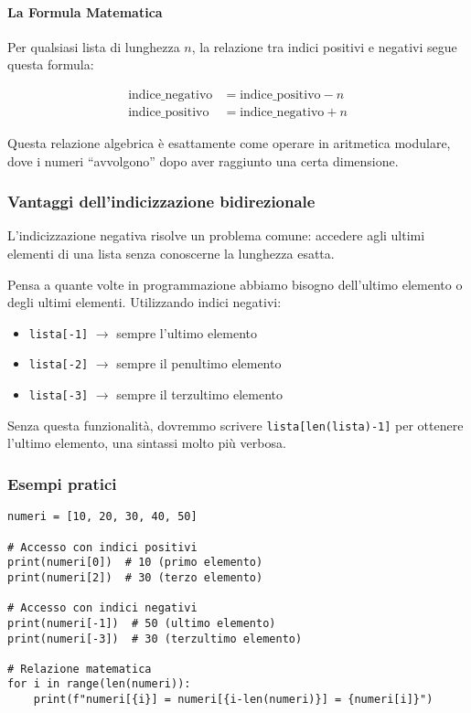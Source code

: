 \paragraph{La Formula Matematica}
Per qualsiasi lista di lunghezza $n$, la relazione tra indici positivi e negativi segue questa formula:

\begin{align}
\text{indice\_negativo} &= \text{indice\_positivo} - n\\
\text{indice\_positivo} &= \text{indice\_negativo} + n
\end{align}

Questa relazione algebrica è esattamente come operare in aritmetica modulare, dove i numeri ``avvolgono'' dopo aver raggiunto una certa dimensione.

\subsubsection{Vantaggi dell'indicizzazione bidirezionale}

L'indicizzazione negativa risolve un problema comune: accedere agli ultimi elementi di una lista senza conoscerne la lunghezza esatta.

Pensa a quante volte in programmazione abbiamo bisogno dell'ultimo elemento o degli ultimi elementi. Utilizzando indici negativi:

\begin{itemize}
    \item \texttt{lista[-1]} $\rightarrow$ sempre l'ultimo elemento
    \item \texttt{lista[-2]} $\rightarrow$ sempre il penultimo elemento
    \item \texttt{lista[-3]} $\rightarrow$ sempre il terzultimo elemento
\end{itemize}

Senza questa funzionalità, dovremmo scrivere \texttt{lista[len(lista)-1]} per ottenere l'ultimo elemento, una sintassi molto più verbosa.

\subsubsection{Esempi pratici}

\begin{lstlisting}[style=pythonstyle]
numeri = [10, 20, 30, 40, 50]

# Accesso con indici positivi
print(numeri[0])  # 10 (primo elemento)
print(numeri[2])  # 30 (terzo elemento)

# Accesso con indici negativi
print(numeri[-1])  # 50 (ultimo elemento)
print(numeri[-3])  # 30 (terzultimo elemento)

# Relazione matematica
for i in range(len(numeri)):
    print(f"numeri[{i}] = numeri[{i-len(numeri)}] = {numeri[i]}")
\end{lstlisting}


